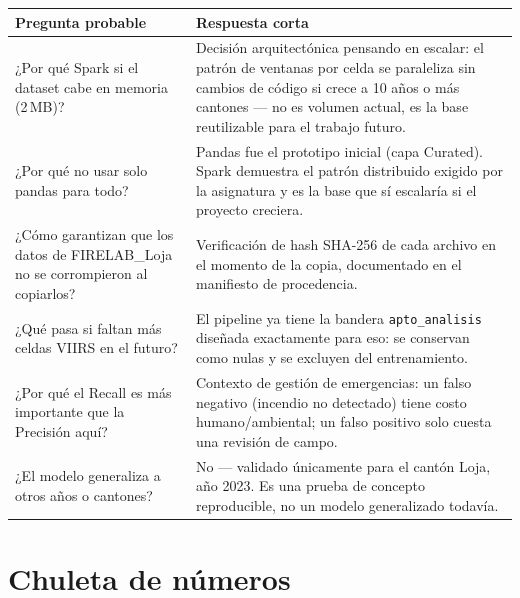 \documentclass[11pt,a4paper]{article}
\begin{document}
\begin{table}[H]
\centering
\small
\begin{tabularx}{\textwidth}{@{}XX@{}}
\toprule
\textbf{Pregunta probable} & \textbf{Respuesta corta} \\
\midrule
¿Por qu\'e Spark si el dataset cabe en memoria (2\,MB)? & Decisi\'on arquitect\'onica pensando en escalar: el patr\'on de ventanas por celda se paraleliza sin cambios de c\'odigo si crece a 10 a\~nos o m\'as cantones --- no es volumen actual, es la base reutilizable para el trabajo futuro. \\
¿Por qu\'e no usar solo pandas para todo? & Pandas fue el prototipo inicial (capa Curated). Spark demuestra el patr\'on distribuido exigido por la asignatura y es la base que s\'i escalar\'ia si el proyecto creciera. \\
¿C\'omo garantizan que los datos de FIRELAB\_Loja no se corrompieron al copiarlos? & Verificaci\'on de hash SHA-256 de cada archivo en el momento de la copia, documentado en el manifiesto de procedencia. \\
¿Qu\'e pasa si faltan m\'as celdas VIIRS en el futuro? & El pipeline ya tiene la bandera \texttt{apto\_analisis} dise\~nada exactamente para eso: se conservan como nulas y se excluyen del entrenamiento. \\
¿Por qu\'e el Recall es m\'as importante que la Precisi\'on aqu\'i? & Contexto de gesti\'on de emergencias: un falso negativo (incendio no detectado) tiene costo humano/ambiental; un falso positivo solo cuesta una revisi\'on de campo. \\
¿El modelo generaliza a otros a\~nos o cantones? & No --- validado \'unicamente para el cant\'on Loja, a\~no 2023. Es una prueba de concepto reproducible, no un modelo generalizado todav\'ia. \\
\bottomrule
\end{tabularx}
\end{table}

\section{Chuleta de n\'umeros}
\end{document}
